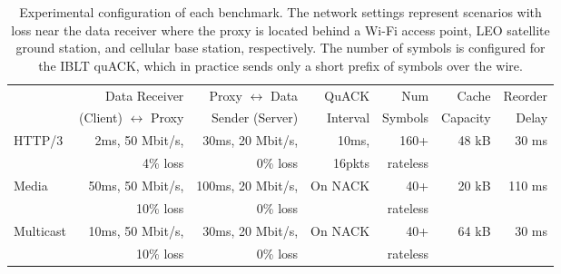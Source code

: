 \begin{table*}
    \centering
    \begin{tabular}{lrrrrrr}
        \toprule
        \bf
        & Data Receiver & Proxy $\leftrightarrow$ Data & QuACK & Num & Cache & Reorder \\
        & (Client) $\leftrightarrow$ Proxy & Sender (Server) &  Interval & Symbols & Capacity & Delay \\
        \midrule
         HTTP/3 & 2ms, 50 Mbit/s, & 30ms, 20 Mbit/s, & 10ms, & 160+ & 48 kB & 30 ms \\
         & 4\% loss & 0\% loss & 16pkts & rateless & & \\
         Media & 50ms, 50 Mbit/s, & 100ms, 20 Mbit/s, & On NACK & 40+ & 20 kB & 110 ms \\
         & 10\% loss & 0\% loss & & rateless & & \\
         Multicast & 10ms, 50 Mbit/s, & 30ms, 20 Mbit/s, & On NACK & 40+ & 64 kB & 30 ms \\
         & 10\% loss & 0\% loss & & rateless & & \\
         \bottomrule
    \end{tabular}
    \caption{Experimental configuration of each benchmark. The network settings
     represent scenarios with loss near the data receiver where the proxy is
     located behind a Wi-Fi access point, LEO satellite ground station, and
     cellular base station, respectively. The number of symbols is configured
     for the IBLT quACK, which in practice sends only a short prefix of symbols
     over the wire.
     }
    \label{tab:packrat:experiment-config}
\end{table*}
